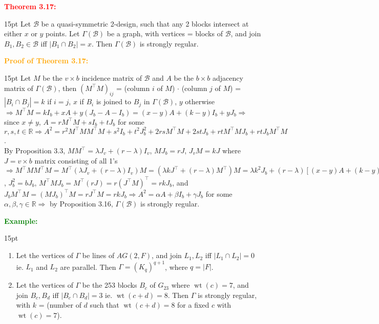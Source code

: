 \documentclass[12pt]{article}
\newcommand{\noparskip}{\vspace{-\parskip}}
\newenvironment{points}
	{\begin{enumerate}[label = (\arabic*)]}
	{\end{enumerate}}
\newenvironment{dent}
	{\begin{adjustwidth}{15pt}{}\noparskip}
	{\end{adjustwidth}}
\newenvironment{result}[1]
	{\textcolor{Red}{\textbf{#1:}}\begin{dent}}
	{\end{dent}}
\newenvironment{proof}[1]
	{\textcolor{Orange}{\textbf{Proof of #1:}}\begin{dent}}
	{\end{dent}}
\newenvironment{example}
	{\textcolor{Green}{\textbf{Example:}}\begin{dent}}
	{\end{dent}}
\renewcommand{\implies}{\Rightarrow}
\newcommand{\sizeof}[1]{\left| #1 \right|}
\newcommand{\R}{\mathbb{R}}
\newcommand{\cB}{\mathcal{B}}
\newcommand{\wt}[1]{\operatorname{wt}(#1)}
\begin{document}
\begin{result}{Theorem 3.17}
Let $\cB$ be a quasi-symmetric 2-design, such that any 2 blocks intersect at either $x$ or $y$ points. Let $\Gamma(\cB)$ be a graph, with vertices = blocks of $\cB$, and join $B_1, B_2 \in \cB$ iff $\sizeof{B_1 \cap B_2} = x$. Then $\Gamma(\cB)$ is strongly regular.
\end{result}

\begin{proof}{Theorem 3.17}
Let $M$ be the $v \times b$ incidence matrix of $\cB$ and $A$ be the $b \times b$ adjacency matrix of $\Gamma(\cB)$, then $(M^\top M)_{ij}$ = (column $i$ of $M$) $\cdot$ (column $j$ of $M$) = $\sizeof{B_i \cap B_j} = k$ if $i = j$, $x$ if $B_i$ is joined to $B_j$ in $\Gamma(\cB)$, $y$ otherwise $\implies M^\top M = kI_b + xA + y(J_b - A - I_b) = (x - y)A + (k - y)I_b + yJ_b \implies$ since $x \ne y$, $A = rM^\top M + sI_b + tJ_b$ for some $r, s, t \in \R \implies A^2 = r^2 M^\top MM^\top M + s^2 I_b + t^2 J_b^2 + 2rsM^\top M + 2stJ_b + rtM^\top M J_b + rtJ_b M^\top M$. \\
By Proposition 3.3, $MM^\top = \lambda J_v + (r - \lambda) I_v$, $MJ_b = rJ$, $J_v M = kJ$ where $J = v \times b$ matrix consisting of all 1's $\implies
M^\top MM^\top M = M^\top (\lambda J_v + (r - \lambda) I_v) M = (\lambda kJ^\top + (r - \lambda)M^\top)M = \lambda k^2 J_b + (r - \lambda)[(x - y)A + (k - y)I_b + yJ_b] = (r - \lambda)(x - y)A = (r - \lambda)(k - y)I_b + (\lambda k^2 + (r - \lambda)y)J_b$,
$J_b^2 = bJ_b$,
$M^\top M J_b = M^\top (rJ) = r(J^\top M)^\top = rkJ_b$,
and $J_b M^\top M = (MJ_b)^\top M = rJ^\top M = rkJ_b \implies A^2 = \alpha A + \beta I_b + \gamma J_b$ for some $\alpha, \beta, \gamma \in \R \implies$ by Proposition 3.16, $\Gamma(\cB)$ is strongly regular.
\end{proof}

\begin{example}
\begin{points}
\item Let the vertices of $\Gamma$ be lines of $AG(2, F)$, and join $L_1, L_2$ iff $\sizeof{L_1 \cap L_2} = 0$ ie. $L_1$ and $L_2$ are parallel. Then $\Gamma = (K_q)^{q + 1}$, where $q = \sizeof{F}$.
\item Let the vertices of $\Gamma$ be the 253 blocks $B_c$ of $G_{23}$ where $\wt{c} = 7$, and join $B_c, B_d$ iff $\sizeof{B_c \cap B_d} = 3$ ie. $\wt{c + d} = 8$. Then $\Gamma$ is strongly regular, with $k$ = (number of $d$ such that $\wt{c + d} = 8$ for a fixed $c$ with $\wt{c} = 7$).
\end{points}
\end{example}
\end{document}
